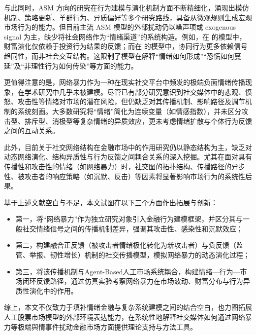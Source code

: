 与此同时，ASM 方向的研究在行为建模与演化机制方面不断精细化，涌现出模仿机制、策略更新、羊群行为、异质偏好等多个研究路线，具备从微观规则生成宏观市场行为的能力。但目前主流 ASM 模型的外部扰动仍以噪声项或 exogenous signal 为主，缺少将社会网络作为“情绪渠道”的系统构造。例如，在\textcite{gao2020wealth} 的模型中，财富演化仅依赖于投资行为结果的反馈；而在\textcite{chen2021herding} 的模型中，协同行为更多依赖信号趋同性，而非社会交互结构。这限制了模型在解释“情绪如何形成”“恐慌如何蔓延”及“非理性行为如何传染”等方面的能力。

更值得注意的是，网络暴力作为一种在现实社交平台中频发的极端负面情绪传播现象，在学术研究中几乎未被建模。尽管已有部分研究意识到社交媒体中的悲观、愤怒、攻击性等情绪对市场的潜在风险，但仍缺乏对其传播机制、影响路径及调节机制的系统刻画。大多数研究将“情绪”简化为连续变量（如情感指数），并未区分攻击型、排斥型、消极型等复杂情绪的异质效应，更未考虑情绪扩散与个体行为反馈之间的互动关系。

此外，目前关于社交网络结构在金融市场中的作用研究仍以静态结构为主，缺乏对动态网络演化、结构异质性与行为反馈之间耦合关系的深入挖掘。尤其在面对具有传播性和攻击性的情绪（如网络暴力）时，社交图的拓扑结构、传播路径的异步性、被攻击者的响应策略（如沉默、反击）等因素将显著影响市场行为的系统性后果。

基于上述文献空白与不足，本文试图在以下三个方面作出拓展与创新：

\begin{itemize}
  \item 第一，将“网络暴力”作为独立研究对象引入金融行为建模框架，并区分其与一般社交情绪信号之间的传播机制差异，强调其攻击性、感染性和沉默效应；
  
  \item 第二，构建融合正反馈（被攻击者情绪极化转化为新攻击者）与负反馈（监管、举报、韧性增长）机制的社交传播模型，模拟网络暴力的动态演化过程；
  
  \item 第三，将该传播机制与Agent-Based人工市场系统耦合，构建情绪—行为—市场闭环反馈路径，通过仿真实验考察网络暴力在市场波动、财富分布与行为异质性演化中的作用。
\end{itemize}

综上，本文不仅致力于填补情绪金融与复杂系统建模之间的结合空白，也力图拓展人工股票市场模型的外部环境表达能力，在系统性地解释社交媒体如何通过网络暴力等极端舆情事件扰动金融市场方面提供理论支持与方法工具。
